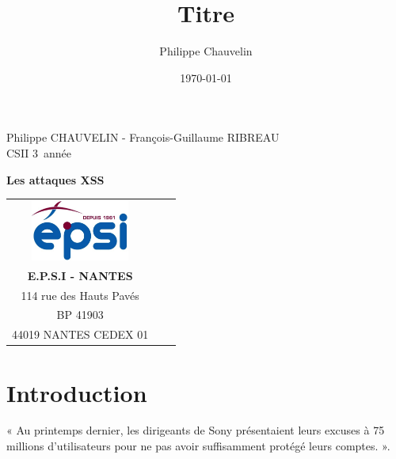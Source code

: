 \documentclass[a4paper,12pt]{report}
\title{Titre}
\author{Philippe Chauvelin}
\date{\today}
\begin{document}
  \begin{titlepage}
    \begin{center}
      Philippe CHAUVELIN - François-Guillaume RIBREAU\\
      CSII 3\ieme~année\\
    \end{center}
    \hrulefill
    \vspace{7cm}
    \begin{center}
      \LARGE \textbf{Les attaques XSS}\\
      \vspace{6cm}

      \begin{tabular}{cp{4cm}c}
        \includegraphics[height=75px]{images/logo_epsi.jpg}\\
        \textbf{E.P.S.I - NANTES}\\
        114 rue des Hauts Pavés\\
        BP 41903\\
        44019 NANTES CEDEX 01\\
      \end{tabular}
    \end{center}
  \end{titlepage}
  \newpage

  \newpage
  \null
  \thispagestyle{empty}
  \setcounter{page}{0}
  \newpage


  \setcounter{page}{1}
  \thispagestyle{empty}
  \newpage

  \chapter*{Introduction} %
    \setcounter{section}{1}


« Au printemps dernier, les dirigeants de Sony présentaient leurs excuses à 75 millions d'utilisateurs pour ne pas avoir suffisamment protégé leurs comptes. ».\\
\end{document}
